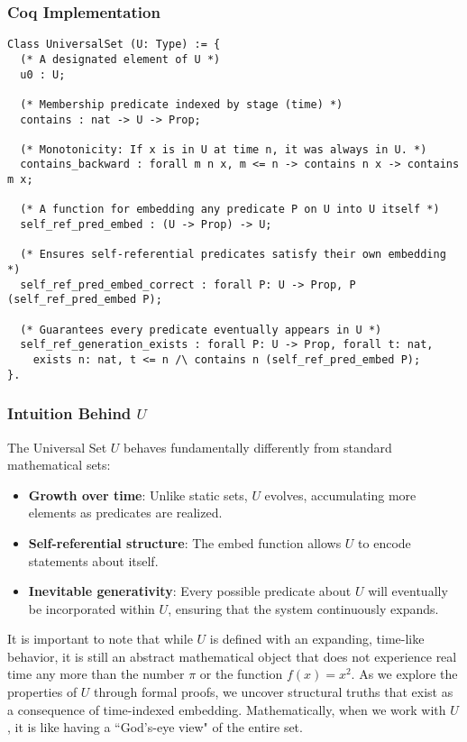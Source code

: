 \documentclass[12pt]{article}
\begin{document}
\subsubsection{Coq Implementation}

\begin{lstlisting}[language=Coq]
Class UniversalSet (U: Type) := {
  (* A designated element of U *)
  u0 : U;                            

  (* Membership predicate indexed by stage (time) *)
  contains : nat -> U -> Prop;       

  (* Monotonicity: If x is in U at time n, it was always in U. *)
  contains_backward : forall m n x, m <= n -> contains n x -> contains m x;

  (* A function for embedding any predicate P on U into U itself *)
  self_ref_pred_embed : (U -> Prop) -> U;

  (* Ensures self-referential predicates satisfy their own embedding *)
  self_ref_pred_embed_correct : forall P: U -> Prop, P (self_ref_pred_embed P);

  (* Guarantees every predicate eventually appears in U *)
  self_ref_generation_exists : forall P: U -> Prop, forall t: nat, 
    exists n: nat, t <= n /\ contains n (self_ref_pred_embed P);
}.
\end{lstlisting}

\subsubsection{Intuition Behind \( U \)}

The Universal Set \( U \) behaves fundamentally differently from standard mathematical sets:

\begin{itemize}
    \item \textbf{Growth over time}: Unlike static sets, \( U \) evolves, accumulating more elements as predicates are realized.
    \item \textbf{Self-referential structure}: The \( \text{embed} \) function allows \( U \) to encode statements about itself.
    \item \textbf{Inevitable generativity}: Every possible predicate about \( U \) will eventually be incorporated within \( U \), ensuring that the system continuously expands.
\end{itemize}

It is important to note that while $U$ is defined with an expanding, time-like behavior, it is still an abstract mathematical object that does not experience real time any more than the number $\pi$ or the function $f(x)=x^2$. As we explore the properties of $U$ through formal proofs, we uncover structural truths that exist as a consequence of time-indexed embedding. Mathematically, when we work with $U$, it is like having a ``God's-eye view" of the entire set.
\end{document}
